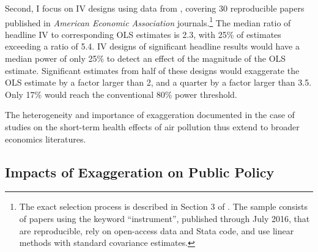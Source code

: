 \documentclass[12pt]{article}
\begin{document}
		Second, I focus on IV designs using data from \cite{young_consistency_2022}, covering 30 reproducible papers published in \textit{American Economic Association} journals.\footnote{The exact selection process is described in Section 3 of \cite{young_consistency_2022}. The sample consists of papers using the keyword ``instrument'', published through July 2016, that are reproducible, rely on open-access data and Stata code, and use linear methods with standard covariance estimates.} The median ratio of headline IV to corresponding OLS estimates is 2.3, with 25\% of estimates exceeding a ratio of 5.4. IV designs of significant headline results would have a median power of only 25\% to detect an effect of the magnitude of the OLS estimate. Significant estimates from half of these designs would exaggerate the OLS estimate by a factor larger than 2, and a quarter by a factor larger than 3.5. Only 17\% would reach the conventional 80\% power threshold. 
		
		The heterogeneity and importance of exaggeration documented in the case of studies on the short-term health effects of air pollution thus extend to broader economics literatures.

	\subsection{Impacts of Exaggeration on Public Policy}
	
\end{document}
